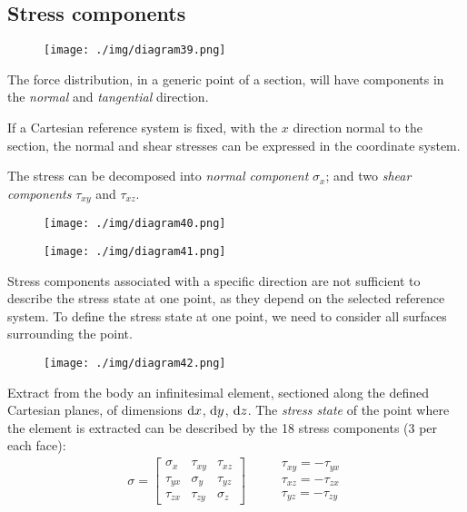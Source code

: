 \subsection{Stress components}
\begin{minipage}{0.4\textwidth}
  \begin{figure}[H]
    \centering
    \texttt{[image: ./img/diagram39.png]}
    \caption{}
  \end{figure}
\end{minipage}
\begin{minipage}{0.05\textwidth}
  \hfill
\end{minipage}
\begin{minipage}{0.55\textwidth}
  The force distribution, in a generic point of a section, will have components in the \textit{normal} and \textit{tangential} direction.

  If a Cartesian reference system is fixed, with the $x$ direction normal to the section, the normal and shear stresses can be expressed in the coordinate system.

  The stress can be decomposed into \textit{normal component} $\sigma_x$; and two \textit{shear components} $\tau_{xy}$ and $\tau_{xz}$.
\end{minipage}
\begin{figure}[H]
  \begin{minipage}{0.5\textwidth}
    \centering
    \texttt{[image: ./img/diagram40.png]}
  \end{minipage}
  \begin{minipage}{0.5\textwidth}
    \centering
    \texttt{[image: ./img/diagram41.png]}
  \end{minipage}
  \caption{}
\end{figure}
Stress components associated with a specific direction are not sufficient to describe the stress state at one point, as they depend on the selected reference system. To define the stress state at one point, we need to consider all surfaces surrounding the point.
\begin{figure}[H]
  \centering
  \texttt{[image: ./img/diagram42.png]}
  \caption{}
\end{figure}
Extract from the body an infinitesimal element, sectioned along the defined Cartesian planes, of dimensions $\dif x$, $\dif y$, $\dif z$. The \textit{stress state} of the point where the element is extracted can be described by the 18 stress components (3 per each face):
\begin{align}
  \sigma = \begin{bmatrix}
    \sigma_x  & \tau_{xy} & \tau_{xz} \\
    \tau_{yx} & \sigma_y  & \tau_{yz} \\
    \tau_{zx} & \tau_{zy} & \sigma_z
  \end{bmatrix} \hspace{1cm}
  \begin{array}{l}
    \tau_{xy} = -\tau_{yx} \\
    \tau_{xz} = -\tau_{zx} \\
    \tau_{yz} = -\tau_{zy}
  \end{array}
\end{align}

